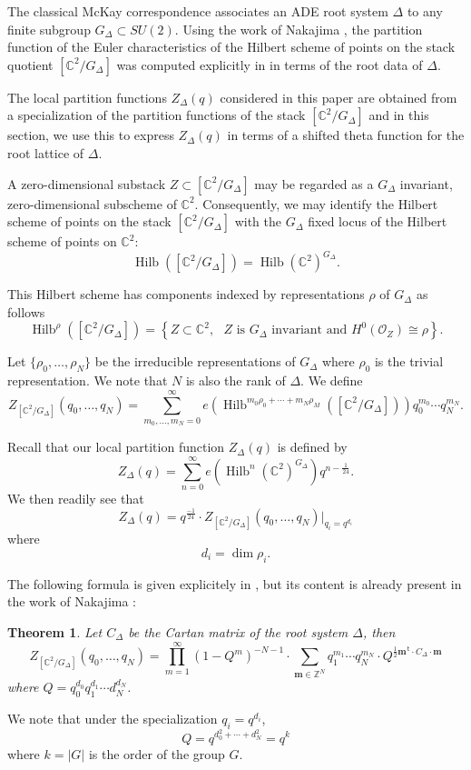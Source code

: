 \documentclass{article}
\newtheorem{theorem}{Theorem}%
\theoremstyle{definition}
\newcommand{\half}{\frac{1}{2}}
\newcommand{\CC} {{\mathbb C}}          %
\newcommand{\ZZ} {{\mathbb Z}}		%
\renewcommand{\O}{\mathcal{O}}
\renewcommand{\top}{\,\mathsf{t}}
\newcommand{\mvec}{\bm{m}}
\newcommand{\Hilb}{\operatorname{Hilb}}
\begin{document}
The classical McKay correspondence associates an ADE root system
$\Delta$ to any finite subgroup $ G_{\Delta}\subset SU(2)$. Using
the work of Nakajima \cite{nakajima2002geometric}, the partition function of the
Euler characteristics of the Hilbert scheme of points on the stack
quotient $[\CC^{2}/G_{\Delta}]$ was computed explicitly in
\cite{gyenge2015euler} in terms of the root data of $\Delta$.

The local partition functions $Z_{\Delta}(q)$ considered in this paper
are obtained from a specialization of the partition functions of the
stack $[\CC^{2} /G_{\Delta}]$ and in this section, we use this to express
$Z_{\Delta}(q)$ in terms of a shifted theta function for the root
lattice of $\Delta$.

A zero-dimensional substack $Z\subset [\CC^{2}/G_{\Delta}]$ may be
regarded as a $G_{\Delta}$ invariant, zero-dimensional subscheme of
$\CC^{2}$. Consequently, we may identify the Hilbert scheme of points
on the stack $[\CC^{2}/G_{\Delta}]$ with the $G_{\Delta}$ fixed locus
of the Hilbert scheme of points on $\CC^{2}$: 
\[
\Hilb \left([\CC^{2}/G_{\Delta}] \right) = \Hilb
(\CC^{2})^{G_{\Delta}} .
\]

This Hilbert scheme has components indexed by representations $\rho$
of $G_{\Delta}$ as follows
\begin{equation*}
\Hilb^{\rho} \left([\CC^{2}/G_{\Delta}] \right) = \left\{ Z\subset
\CC^{2}, \text{ $Z$ is $G_{\Delta}$ invariant and $H^{0}(\O_{Z})\cong
\rho $} \right\}.
\end{equation*}

Let $\{\rho_{0},\dotsc ,\rho_{N} \}$ be the irreducible
representations of $G_{\Delta}$ where $\rho_{0}$ is the trivial
representation. We note that $N$ is also the rank of $\Delta$. We
define
\[
Z_{[\CC^{2}/G_{\Delta}]} (q_{0},\dotsc ,q_{N}) = \sum_{m_{0},\dotsc
,m_{N}=0}^{\infty} e\left(\Hilb^{m_{0}\rho_{0}+\dotsb
+m_{N}\rho_{M}}([\CC^{2}/G_{\Delta}]) \right) q_{0}^{m_{0}}\dotsb
q_{N}^{m_{N}} .
\]

Recall that our local partition function $Z_{\Delta}(q)$ is defined by
\[
Z_{\Delta}(q) = \sum_{n=0}^{\infty}
e\left(\Hilb^{n}(\CC^{2})^{G_{\Delta}} \right) q^{n-\frac{1}{24}}. 
\]
We then readily see that
\[
Z_{\Delta}(q) = q^{\frac{-1}{24}}\cdot  Z_{[\CC^{2}/G_{\Delta}]}
(q_{0},\dotsc ,q_{N})|_{q_{i}=q^{d_{i}}}
\]
where
\[
d_{i} =\dim \rho_{i}.
\]

The following formula is given explicitely in \cite[Thm~1.3]{gyenge2015euler}, but its content is already present in the work of Nakajima \cite{nakajima2002geometric}:
\begin{theorem} \label{thm: Zorbifold formula}
Let $C_{\Delta}$ be the Cartan matrix of the root system $\Delta$,
then 
\[
Z_{[\CC^{2}/G_{\Delta}]} (q_{0},\dotsc ,q_{N}) = \prod_{m=1}^{\infty}
(1-Q^{m})^{-N-1} \cdot \sum_{\mvec \in \ZZ^{N}} q_{1}^{m_{1}}\dotsb
q_{N}^{m_{N}} \cdot Q^{\half \mvec^{\top}\cdot C_{\Delta}\cdot \mvec}
\]
where $Q=q_{0}^{d_{0}}q_{1}^{d_{1}}\dotsb d_{N}^{d_{N}}$.
\end{theorem}
We note that under the specialization $q_{i}=q^{d_{i}}$, 
\[
Q=q^{d_{0}^{2}+\dotsb +d_{N}^{2}} = q^{k}
\]
where $k=|G|$ is the order of the group $G$.
\end{document}
